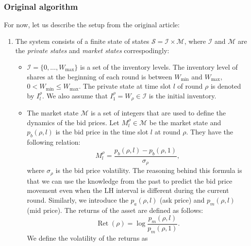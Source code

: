         \subsubsection{Original algorithm}
            For now, let us describe the setup from the original article:
            \begin{enumerate}
                \item The system consists of a finite state of states $\mathcal S = \mathcal I \times \mathcal M$, where $\mathcal I$ and $\mathcal M$ are the \emph{private states} and \emph{market states} correspodingly:
                \begin{itemize}
                    \item $\mathcal I = \{0,\dots, W_{\text{max}}\}$ is a set of the inventory levels. The inventory level of shares at the beginning of each round
                        is between $W_{\text{min}}$ and $W_{\text{max}}$, $0 < W_{\text{min}} \leq W_{\text{max}}$. The private state at time slot $l$ of round $\rho$ 
                        is denoted by $I_l^\rho$. We also assume that $I_1^\rho = W_\rho \in \mathcal I$ is the initial inventory.
                    \item The market state $\mathcal M$ is a set of integers that are used to define the dynamics of the bid prices. Let $M_l^\rho\in \mathcal M$ be 
                        the market state and $p_b(\rho, l)$ is the bid price in the time slot $l$ at round $\rho$. They have the following relation:
                        \begin{equation}
                            M_l^\rho = \frac{p_b(\rho, l) - p_b(\rho, 1)}{\sigma_\rho},
                        \end{equation}
                        where $\sigma_\rho$ is the bid price volatility. 
                        The reasoning behind this formula is that we can use the knowledge from the past to predict the bid price movement even when the LH interval 
                        is different during the current round. Similarly, we introduce the $p_a(\rho, l)$ (ask price) and $p_m(\rho, l)$ (mid price).
                        The returns of the asset are defined as follows:
                        \begin{equation*}
                            \operatorname*{Ret} (\rho) = \log \frac{p_m(\rho, l)}{p_m(\rho, 1)} .
                        \end{equation*}
                        We define the volatility of the returns as
                        \begin{equation*}

\end{equation*}
\end{itemize}
\end{enumerate}

